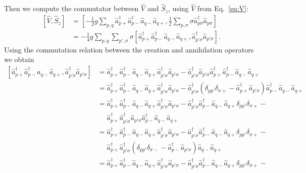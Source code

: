 \documentclass[a4paper,11pt,twoside]{article}
\begin{document}
%
Then we compute the commutator between
$\hat V$ and $\hat S_z$, using $\hat V$ from Eq.~\eqref{eq:V}:
\begin{align*}
\left[ \hat V , \hat S_z \right]
%
&= \left[ -\frac{1}{2} g \sum_{p,q} \hat a_{p+}^\dagger \hat a_{p-}^\dagger \hat a_{q-} \hat a_{q+} , \frac{1}{2} \sum_{p,\sigma} \sigma \hat a_{p\sigma}^\dagger \hat a_{p\sigma} \right] \\
%
&= -\frac{1}{4} g \sum_{p,q} \sum_{p',\sigma} \sigma \left[ \hat a_{p+}^\dagger \hat a_{p-}^\dagger \hat a_{q-} \hat a_{q+}, \hat a_{p'\sigma}^\dagger \hat a_{p'\sigma} \right] .
\end{align*}
%
Using the commutation relation between the creation and annihilation operators we obtain
\begin{align*}
\left[ \hat a_{p+}^\dagger \hat a_{p-}^\dagger \hat a_{q-} \hat a_{q+}, \hat a_{p'\sigma}^\dagger \hat a_{p'\sigma} \right]
%
&= \hat a_{p+}^\dagger \hat a_{p-}^\dagger \hat a_{q-} \hat a_{q+} \hat a_{p'\sigma}^\dagger \hat a_{p'\sigma} -
\hat a_{p'\sigma}^\dagger \hat a_{p'\sigma} \hat a_{p+}^\dagger \hat a_{p-}^\dagger \hat a_{q-} \hat a_{q+} \\
%
&= \hat a_{p+}^\dagger \hat a_{p-}^\dagger \hat a_{q-} \hat a_{q+} \hat a_{p'\sigma}^\dagger \hat a_{p'\sigma} -
\hat a_{p'\sigma}^\dagger \left( \delta_{pp'} \delta_{\sigma+} - \hat a_{p+}^\dagger \hat a_{p'\sigma} \right) \hat a_{p-}^\dagger \hat a_{q-} \hat a_{q+} \\
%
&= \hat a_{p+}^\dagger \hat a_{p-}^\dagger \hat a_{q-} \hat a_{q+} \hat a_{p'\sigma}^\dagger \hat a_{p'\sigma} -
\hat a_{p'\sigma}^\dagger \hat a_{p-}^\dagger \hat a_{q-} \hat a_{q+} \delta_{pp'} \delta_{\sigma+} - \\
&\quad\,\,
\hat a_{p+}^\dagger \hat a_{p'\sigma}^\dagger \hat a_{p'\sigma} \hat a_{p-}^\dagger \hat a_{q-} \hat a_{q+} \\
%
&= \hat a_{p+}^\dagger \hat a_{p-}^\dagger \hat a_{q-} \hat a_{q+} \hat a_{p'\sigma}^\dagger \hat a_{p'\sigma} -
\hat a_{p'\sigma}^\dagger \hat a_{p-}^\dagger \hat a_{q-} \hat a_{q+} \delta_{pp'} \delta_{\sigma+} - \\
&\quad\,\,
\hat a_{p+}^\dagger \hat a_{p'\sigma}^\dagger \left( \delta_{pp'} \delta_{\sigma-} - \hat a_{p-}^\dagger \hat a_{p'\sigma} \right) \hat a_{q-} \hat a_{q+} \\
%
&= \hat a_{p+}^\dagger \hat a_{p-}^\dagger \hat a_{q-} \hat a_{q+} \hat a_{p'\sigma}^\dagger \hat a_{p'\sigma} -
\hat a_{p'\sigma}^\dagger \hat a_{p-}^\dagger \hat a_{q-} \hat a_{q+} \delta_{pp'} \delta_{\sigma+} - \\

\end{align*}
\end{document}
